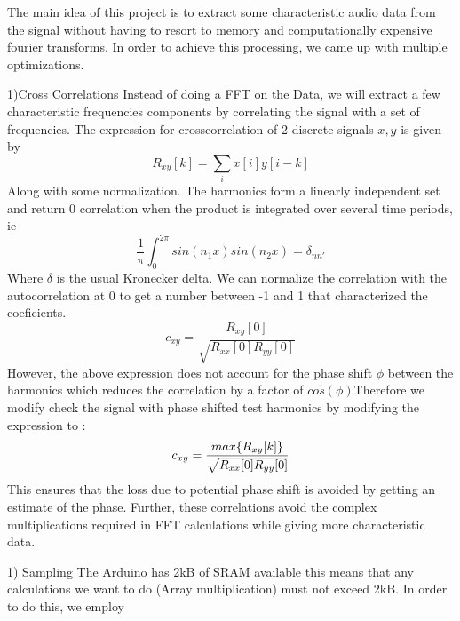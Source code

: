 
The main idea of this project is to extract some characteristic audio data from the signal without having to resort to memory and computationally expensive fourier transforms. In order to achieve this processing, we came up with multiple optimizations. 

1)Cross Correlations 
Instead of doing a FFT on the Data, we will extract a few characteristic frequencies components by correlating the signal with a set of frequencies. The expression for crosscorrelation of 2 discrete signals \(x,y\) is given by 
\begin{equation}
    R_{xy}[k] = \sum_{i} x[i]y[i-k]
\end{equation}
Along with some normalization. The harmonics form a linearly independent set and return 0 correlation when the product is integrated over several time periods, ie 
\begin{equation}
    \frac{1}{\pi} \int_0^{2\pi}sin(n_1x)sin(n_2x) = \delta_{nn'}  
\end{equation} 
Where \(\delta\) is the usual Kronecker delta. We can normalize the correlation with the autocorrelation at 0 to get a number between -1 and 1 that characterized the coeficients.
\begin{equation}
    c_{xy} = \frac{R_{xy}[0]}{\sqrt{R_{xx}[0]R_{yy}[0]} }
\end{equation} 
However, the above expression does not account for the phase shift \(\phi\) between the harmonics which reduces the correlation by a factor of \(cos(\phi)\)Therefore we modify check the signal with phase shifted test harmonics by modifying the expression to :
\begin{equation}
    c_{xy} = \frac{\mathnormal{max}\{R_{xy}[k]\}}{\sqrt{R_{xx}[0]R_{yy}[0]} }
\end{equation}
This ensures that the loss due to potential phase shift is avoided by getting an estimate of the phase. 
Further, these correlations avoid the complex multiplications required in FFT calculations while giving more characteristic data. 

1) Sampling 
The Arduino has 2kB of SRAM available this means that any calculations we want to do (Array multiplication) must not exceed 2kB. In order to do this, we employ  

